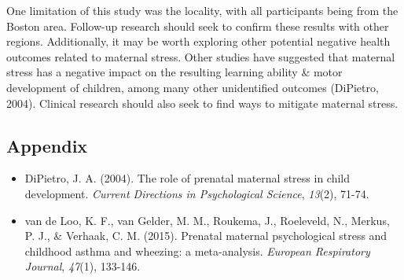 \documentclass{article}
\begin{document}
	One limitation of this study was the locality, with all participants being from the Boston area. Follow-up research should seek to confirm these results with other regions. Additionally, it may be worth exploring other potential negative health outcomes related to maternal stress. Other studies have suggested that maternal stress has a negative impact on the resulting learning ability \& motor development of children, among many other unidentified outcomes (DiPietro, 2004). Clinical research should also seek to find ways to mitigate maternal stress.

	\newpage
	\subsection*{Appendix}

	\begin{itemize}
		\item DiPietro, J. A. (2004). The role of prenatal maternal stress in child development. \textit{Current Directions in Psychological Science}, \textit{13}(2), 71-74.
		\item van de Loo, K. F., van Gelder, M. M., Roukema, J., Roeleveld, N., Merkus, P. J., \& Verhaak, C. M. (2015). Prenatal maternal psychological stress and childhood asthma and wheezing: a meta-analysis. \textit{European Respiratory Journal}, \textit{47}(1), 133-146.
	\end{itemize}
\end{document}
